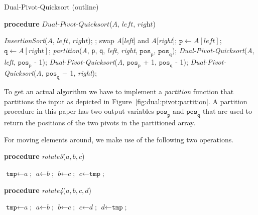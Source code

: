 \documentclass[prodmode,acmtalg]{acmsmall}
\begin{document}
\begin{algorithm}
    \caption{Dual-Pivot-Quicksort (outline)}\samepage\label{algo:dual:pivot:outline}
    \textbf{procedure} $\textit{Dual-Pivot-Quicksort}$($\textit{A}$, $\textit{left}$, $\textit{right}$)
    \begin{algorithmic}[1]
        \State \textit{InsertionSort}($\textit{A}$, $\textit{left}$, $\textit{right}$);
            \State \Return;
        \EndIf
        \State swap \textit{A}[\textit{left}] and \textit{A}[\textit{right}];
        \EndIf
        \State $\texttt{p} \gets A[\textit{left}]$;
        \State $\texttt{q} \gets A[\textit{right}]$;
        \State \textit{partition}(\textit{A}, \texttt{p}, \texttt{q}, \textit{left}, \textit{right}, $\texttt{pos}_\texttt{p}$, $\texttt{pos}_\texttt{q}$);
        \State \textit{Dual-Pivot-Quicksort}(\textit{A}, \textit{left}, $\texttt{pos}_\texttt{p}$ - 1);
        \State \textit{Dual-Pivot-Quicksort}(\textit{A}, $\texttt{pos}_\texttt{p}$ + 1, $\texttt{pos}_\texttt{q}$ - 1);
        \State \textit{Dual-Pivot-Quicksort}(\textit{A}, $\texttt{pos}_\texttt{q}$ + 1, \textit{right});
\end{algorithmic}
\end{algorithm}
To get an actual algorithm we have to implement a \textit{partition} function
that partitions the input as depicted in Figure~\ref{fig:dual:pivot:partition}.
A partition procedure in this paper has two output variables
$\texttt{pos}_{\texttt{p}}$ and $\texttt{pos}_{\texttt{q}}$ that are used to return
the positions of the two pivots in the partitioned array.

For moving elements around, we make use of the following two operations.

\begin{minipage}[t]{5cm}
\begin{algorithm}[H]
    \textbf{procedure} \textit{rotate3}($\textit{a}, \textit{b}, \textit{c}$)
    \begin{algorithmic}[1]
        \State $\texttt{tmp} \gets \textit{a}$;
        \State $\textit{a} \gets \textit{b}$;
        \State $\textit{b} \gets \textit{c}$;
        \State $\textit{c} \gets \texttt{tmp}$;
    \end{algorithmic}
\end{algorithm}
\end{minipage}
\begin{minipage}[t]{3cm}
    \hfill
\end{minipage}
\begin{minipage}[t]{5cm}
    \begin{algorithm}[H]
    \textbf{procedure} \textit{rotate4}($\textit{a}, \textit{b}, \textit{c}, \textit{d}$)
    \begin{algorithmic}[1]
        \State $\texttt{tmp} \gets \textit{a}$;
        \State $\textit{a} \gets \textit{b}$;
        \State $\textit{b} \gets \textit{c}$;
        \State $\textit{c} \gets \textit{d}$;
        \State $\textit{d} \gets \texttt{tmp}$;
    \end{algorithmic}
    \end{algorithm}
\end{minipage}
\end{document}
